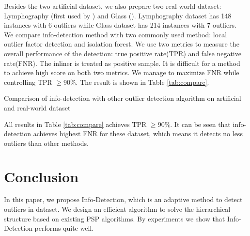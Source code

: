 \documentclass[runningheads]{llncs}
\begin{document}
Besides the two artificial dataset, we also prepare two real-world dataset: Lymphography (first used by \cite{Lazarevic}) and Glass (\cite{hics}). Lymphography dataset has 148 instances with 6 outliers while Glass dataset has 214 instances with 7 outliers. We compare info-detection method with two commonly used method: local outlier factor detection and isolation forest. We use two metrics to measure the overall performance of the detection: true positive rate(TPR) and false negative rate(FNR). The inliner is treated as positive sample. It is difficult for a method to achieve high score on both two metrics. We manage to maximize FNR while controlling TPR $\geq 90\%$. The result is shown in Table \ref{tab:compare}.
\begin{table}[!ht]
\centering
{}
\caption{Comparison of info-detection with other outlier detection algorithm on artificial and real-world dataset}\label{tab:compare}
\end{table}

All results in Table \ref{tab:compare} achieves TPR $\geq 90\%$. It can be seen that info-detection achieves highest FNR for these dataset, which means it detects no less outliers than other methods.

\section{Conclusion}\label{sec:Conclusion}
In this paper, we propose Info-Detection, which is an adaptive method to detect outliers in dataset. We design an efficient algorithm to solve the hierarchical structure based on existing PSP algorithms. By experiments we show that Info-Detection performs quite well.
%
%
%


%
\appendix
\end{document}
